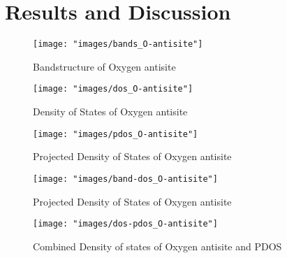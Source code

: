 \chapter{Results and Discussion}

\begin{figure}[tbh!]
	\centering
	\texttt{[image: "images/bands\_O-antisite"]}
	\caption[Bandstructure of Oxygen antisite]{Bandstructure of Oxygen antisite}
\end{figure}

\begin{figure}[tbh!]
	\centering
	\texttt{[image: "images/dos\_O-antisite"]}
	\caption[Density of states of Oxygen antisite]{Density of States of Oxygen antisite}
\end{figure}

\begin{figure}[tbh!]
	\centering
	\texttt{[image: "images/pdos\_O-antisite"]}
	\caption[Projected Density of states of Oxygen antisite]{Projected Density of States of Oxygen antisite}
\end{figure}

\begin{figure}[tbh!]
	\centering
	\texttt{[image: "images/band-dos\_O-antisite"]}
	\caption[Combined Density of states of Oxygen antisite]{Projected Density of States of Oxygen antisite}
\end{figure}

\begin{figure}[tbh!]
	\centering
	\texttt{[image: "images/dos-pdos\_O-antisite"]}
	\caption[Combined Density of states of Oxygen antisite and PDOS]{Combined Density of states of Oxygen antisite and PDOS}
\end{figure}





